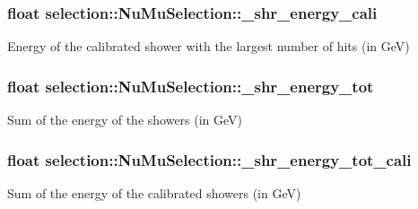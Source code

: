 \subsubsection[{\texorpdfstring{\+\_\+shr\+\_\+energy\+\_\+cali}{_shr_energy_cali}}]{\setlength{\rightskip}{0pt plus 5cm}float selection\+::\+Nu\+Mu\+Selection\+::\+\_\+shr\+\_\+energy\+\_\+cali\hspace{0.3cm}{\ttfamily [private]}}\hypertarget{classselection_1_1NuMuSelection_a902fba92b860066bac4ba35e1e014891}{}\label{classselection_1_1NuMuSelection_a902fba92b860066bac4ba35e1e014891}
Energy of the calibrated shower with the largest number of hits (in GeV) 
\subsubsection[{\texorpdfstring{\+\_\+shr\+\_\+energy\+\_\+tot}{_shr_energy_tot}}]{\setlength{\rightskip}{0pt plus 5cm}float selection\+::\+Nu\+Mu\+Selection\+::\+\_\+shr\+\_\+energy\+\_\+tot\hspace{0.3cm}{\ttfamily [private]}}\hypertarget{classselection_1_1NuMuSelection_a73da6cca89a0a1a854297f4d0a2ac851}{}\label{classselection_1_1NuMuSelection_a73da6cca89a0a1a854297f4d0a2ac851}
Sum of the energy of the showers (in GeV) 
\subsubsection[{\texorpdfstring{\+\_\+shr\+\_\+energy\+\_\+tot\+\_\+cali}{_shr_energy_tot_cali}}]{\setlength{\rightskip}{0pt plus 5cm}float selection\+::\+Nu\+Mu\+Selection\+::\+\_\+shr\+\_\+energy\+\_\+tot\+\_\+cali\hspace{0.3cm}{\ttfamily [private]}}\hypertarget{classselection_1_1NuMuSelection_a1401935e64b23d52ece082c731c87624}{}\label{classselection_1_1NuMuSelection_a1401935e64b23d52ece082c731c87624}
Sum of the energy of the calibrated showers (in GeV) 
